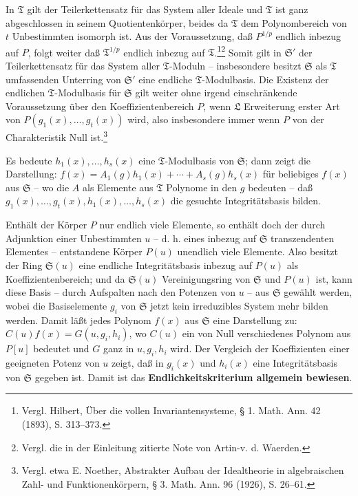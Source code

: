 \documentclass[11pt]{article}
\begin{document}
In $\mathfrak T$ gilt der Teilerkettensatz für das System aller Ideale und $\mathfrak T$ ist ganz abgeschlossen in seinem Quotientenkörper, beides da $\mathfrak T$ dem Polynombereich von $t$ Unbestimmten isomorph ist. Aus der Voraussetzung, daß $P^{1/p}$ endlich inbezug auf $P$, folgt weiter daß $\mathfrak T^{1/p}$ endlich inbezug auf $\mathfrak T$.\footnote{Vergl. Hilbert, Über die vollen Invariantensysteme, § 1. Math. Ann. 42 (1893), S. 313--373.}\footnote{Vergl. die in der Einleitung zitierte Note von Artin-v. d. Waerden.} Somit gilt in $\mathfrak S'$ der Teilerkettensatz für das System aller $\mathfrak T$-Moduln -- insbesondere besitzt $\mathfrak S$ als $\mathfrak T$ umfassenden Unterring von $\mathfrak S'$ eine endliche $\mathfrak T$-Modulbasis. Die Existenz der endlichen $\mathfrak T$-Modulbasis für $\mathfrak S$ gilt weiter ohne irgend einschränkende Voraussetzung über den Koeffizientenbereich $P$, wenn $\mathfrak L$ Erweiterung erster Art von $P(g_1(x),\ldots,g_t(x))$ wird, also insbesondere immer wenn $P$ von der Charakteristik Null ist.\footnote{Vergl. etwa E. Noether, Abstrakter Aufbau der Idealtheorie in algebraischen Zahl- und Funktionenkörpern, § 3. Math. Ann. 96 (1926), S. 26--61.}

Es bedeute $h_1(x),\ldots,h_s(x)$ eine $\mathfrak T$-Modulbasis von $\mathfrak S$; dann zeigt die Darstellung: $f(x)=A_1(g)h_1(x)+\cdots+A_s(g)h_s(x)$ für beliebiges $f(x)$ aus $\mathfrak S$ -- wo die $A$ als Elemente aus $\mathfrak T$ Polynome in den $g$ bedeuten -- daß $g_1(x),\ldots,g_t(x),h_1(x),\ldots,h_s(x)$ die gesuchte Integritätsbasis bilden.

Enthält der Körper $P$ nur endlich viele Elemente, so enthält doch der durch Adjunktion einer Unbestimmten $u$ -- d. h. eines inbezug auf $\mathfrak S$ transzendenten Elementes -- entstandene Körper $P(u)$ unendlich viele Elemente. Also besitzt der Ring $\mathfrak S(u)$ eine endliche Integritätsbasis inbezug auf $P(u)$ als Koeffizientenbereich; und da $\mathfrak S(u)$ Vereinigungsring von $\mathfrak S$ und $P(u)$ ist, kann diese Basis -- durch Aufspalten nach den Potenzen von $u$ -- aus $\mathfrak S$ gewählt werden, wobei die Basiselemente $g_i$ von $\mathfrak S$ jetzt kein irreduzibles System mehr bilden werden. Damit läßt jedes Polynom $f(x)$ aus $\mathfrak S$ eine Darstellung zu: $C(u)f(x)=G(u,g_i,h_i)$, wo $C(u)$ ein von Null verschiedenes Polynom aus $P[u]$ bedeutet und $G$ ganz in $u,g_i,h_i$ wird. Der Vergleich der Koeffizienten einer geeigneten Potenz von $u$ zeigt, daß in $g_i(x)$ und $h_i(x)$ eine Integritätsbasis von $\mathfrak S$ gegeben ist. Damit ist das \textbf{Endlichkeitskriterium allgemein bewiesen}.
\end{document}
